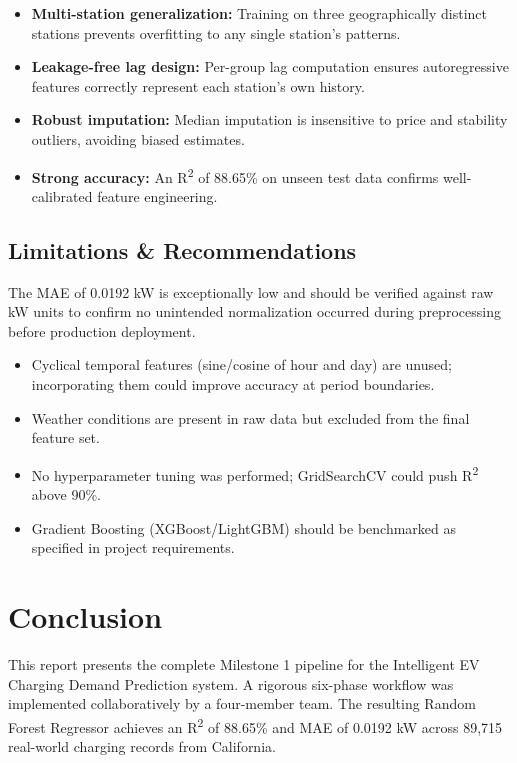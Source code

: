 \documentclass[12pt, a4paper]{article}
\begin{document}
\begin{itemize}
  \item \textbf{Multi-station generalization:} Training on three geographically distinct stations prevents overfitting to any single station's patterns.
  \item \textbf{Leakage-free lag design:} Per-group lag computation ensures autoregressive features correctly represent each station's own history.
  \item \textbf{Robust imputation:} Median imputation is insensitive to price and stability outliers, avoiding biased estimates.
  \item \textbf{Strong accuracy:} An R\textsuperscript{2} of 88.65\% on unseen test data confirms well-calibrated feature engineering.
\end{itemize}

\subsection{Limitations \& Recommendations}

\begin{tcolorbox}[warning, title=Validation Note]
The MAE of 0.0192 kW is exceptionally low and should be verified against raw kW
units to confirm no unintended normalization occurred during preprocessing before
production deployment.
\end{tcolorbox}

\begin{itemize}
  \item Cyclical temporal features (sine/cosine of hour and day) are unused; incorporating them could improve accuracy at period boundaries.
  \item Weather conditions are present in raw data but excluded from the final feature set.
  \item No hyperparameter tuning was performed; GridSearchCV could push R\textsuperscript{2} above 90\%.
  \item Gradient Boosting (XGBoost/LightGBM) should be benchmarked as specified in project requirements.
\end{itemize}

\section{Conclusion}

This report presents the complete Milestone 1 pipeline for the Intelligent EV
Charging Demand Prediction system. A rigorous six-phase workflow was implemented
collaboratively by a four-member team. The resulting Random Forest Regressor
achieves an R\textsuperscript{2} of 88.65\% and MAE of 0.0192 kW across 89,715
real-world charging records from California.
\end{document}
